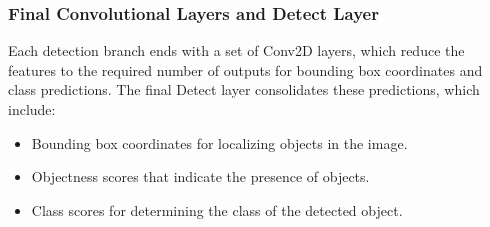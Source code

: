 \documentclass{article}
\begin{document}
\subsubsection{Final Convolutional Layers and Detect Layer}
Each detection branch ends with a set of Conv2D layers, which reduce the features to the required number of outputs for bounding box coordinates and class predictions. The final Detect layer consolidates these predictions, which include:

\begin{itemize}
    \item Bounding box coordinates for localizing objects in the image.
    \item Objectness scores that indicate the presence of objects.
    \item Class scores for determining the class of the detected object.
\end{itemize}
\end{document}
